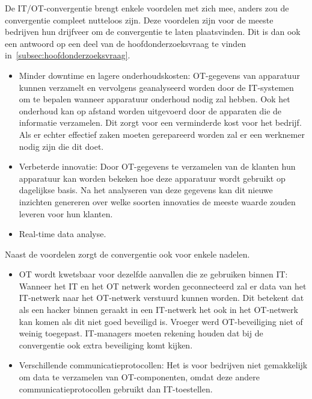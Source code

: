 De IT/OT-convergentie brengt enkele voordelen met zich mee, anders zou de convergentie compleet nutteloos zijn. Deze voordelen zijn voor de meeste bedrijven hun drijfveer om de convergentie te laten plaatsvinden. Dit is dan ook een antwoord op een deel van de hoofdonderzoeksvraag te vinden in~\ref{subsec:hoofdonderzoeksvraag}.
\begin{itemize}
    \item Minder downtime en lagere onderhoudskosten: OT-gegevens van apparatuur kunnen verzamelt en vervolgens geanalyseerd worden door de IT-systemen om te bepalen wanneer apparatuur onderhoud nodig zal hebben. Ook het onderhoud kan op afstand worden uitgevoerd door de apparaten die de informatie verzamelen. Dit zorgt voor een verminderde kost voor het bedrijf. Als er echter effectief zaken moeten gerepareerd worden zal er een werknemer nodig zijn die dit doet.
    \item Verbeterde innovatie: Door OT-gegevens te verzamelen van de klanten hun apparatuur kan worden bekeken hoe deze apparatuur wordt gebruikt op dagelijkse basis. Na het analyseren van deze gegevens kan dit nieuwe inzichten genereren over welke soorten innovaties de meeste waarde zouden leveren voor hun klanten. 
    \item Real-time data analyse.
\end{itemize}

Naast de voordelen zorgt de convergentie ook voor enkele nadelen.
\begin{itemize}
    \item OT wordt kwetsbaar voor dezelfde aanvallen die ze gebruiken binnen IT: Wanneer het IT en het OT netwerk worden geconnecteerd zal er data van het IT-netwerk naar het OT-netwerk verstuurd kunnen worden. Dit betekent dat als een hacker binnen geraakt in een IT-netwerk het ook in het OT-netwerk kan komen als dit niet goed beveiligd is. Vroeger werd OT-beveiliging niet of weinig toegepast. IT-managers moeten rekening houden dat bij de convergentie ook extra beveiliging komt kijken. 
    \item Verschillende communicatieprotocollen: Het is voor bedrijven niet gemakkelijk om data te verzamelen van OT-componenten, omdat deze andere communicatieprotocollen gebruikt dan IT-toestellen.
\end{itemize}

